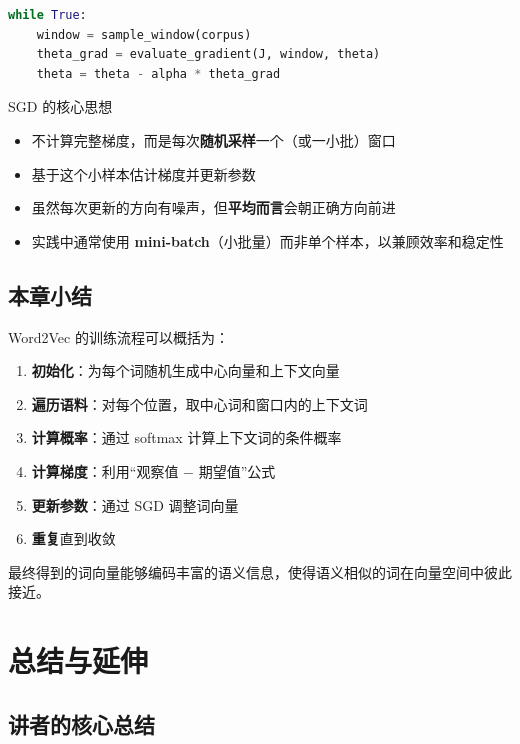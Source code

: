 \documentclass[a4paper]{article}
\begin{document}
\begin{lstlisting}[caption={SGD / Mini-batch Gradient Descent 伪代码},language=Python]
while True:
    window = sample_window(corpus)
    theta_grad = evaluate_gradient(J, window, theta)
    theta = theta - alpha * theta_grad
\end{lstlisting}

\begin{importantbox}{SGD 的核心思想}
\begin{itemize}
    \item 不计算完整梯度，而是每次\textbf{随机采样}一个（或一小批）窗口
    \item 基于这个小样本估计梯度并更新参数
    \item 虽然每次更新的方向有噪声，但\textbf{平均而言}会朝正确方向前进
    \item 实践中通常使用 \textbf{mini-batch}（小批量）而非单个样本，以兼顾效率和稳定性
\end{itemize}
\end{importantbox}

\subsection{本章小结}

Word2Vec 的训练流程可以概括为：

\begin{enumerate}
    \item \textbf{初始化}：为每个词随机生成中心向量和上下文向量
    \item \textbf{遍历语料}：对每个位置，取中心词和窗口内的上下文词
    \item \textbf{计算概率}：通过 softmax 计算上下文词的条件概率
    \item \textbf{计算梯度}：利用``观察值 $-$ 期望值''公式
    \item \textbf{更新参数}：通过 SGD 调整词向量
    \item \textbf{重复}直到收敛
\end{enumerate}

最终得到的词向量能够编码丰富的语义信息，使得语义相似的词在向量空间中彼此接近。


\section{总结与延伸}

\subsection{讲者的核心总结}
\end{document}
